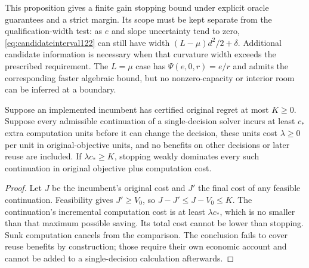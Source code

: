 This proposition gives a finite gain stopping bound under explicit
oracle guarantees and a strict margin. Its scope must be kept separate
from the qualification-width test: as $e$ and slope uncertainty tend
to zero, \eqref{eq:candidateinterval122} can still have width
$(L-\mu)d^2/2+\delta$. Additional candidate information is necessary
when that curvature width exceeds the prescribed requirement.
The $L=\mu$ case has $\Psi(e,0,r)=e/r$ and admits the corresponding
faster algebraic bound, but no nonzero-capacity or interior room can
be inferred at a boundary.

\begin{proposition}
\label{prop:pricedstop122}
Suppose an implemented incumbent has certified original regret at most
$K\ge0$. Suppose every admissible continuation of a single-decision
solver incurs at least $c_*$ extra computation units before it can
change the decision, these units cost $\lambda\ge0$ per unit in
original-objective units, and no benefits on other decisions or later
reuse are included. If $\lambda c_*\ge K$, stopping weakly dominates
every such continuation in original objective plus computation cost.
\end{proposition}

\begin{proof}
Let $J$ be the incumbent's original cost and $J'$ the final cost of
any feasible continuation. Feasibility gives $J'\ge V_0$, so
$J-J'\le J-V_0\le K$. The continuation's incremental computation
cost is at least $\lambda c_*$, which is no smaller than that maximum
possible saving. Its total cost cannot be lower than stopping.
Sunk computation cancels from the comparison. The conclusion fails to
cover reuse benefits by construction; those require their own economic
account and cannot be added to a single-decision calculation afterwards.
\end{proof}
